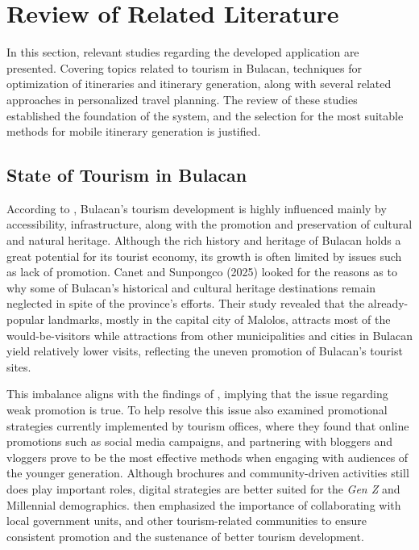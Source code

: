 \section{Review of Related Literature}
In this section, relevant studies regarding the developed application are presented. Covering topics related to tourism in Bulacan, techniques for optimization of itineraries and itinerary generation, along with several related approaches in personalized travel planning. The review of these studies established the foundation of the system, and the selection for the most suitable methods for mobile itinerary generation is justified.

\subsection{State of Tourism in Bulacan}

According to \textcite{Canet2024P}, Bulacan’s tourism development is highly influenced mainly by accessibility, infrastructure, along with the promotion and preservation of cultural and natural heritage. Although the rich history and heritage of Bulacan holds a great potential for its tourist economy, its growth is often limited by issues such as lack of promotion. Canet and Sunpongco (2025) looked for the reasons as to why some of Bulacan’s historical and cultural heritage destinations remain neglected in spite of the province's efforts. Their study revealed that the already-popular landmarks, mostly in the capital city of Malolos, attracts most of the would-be-visitors while attractions from other municipalities and cities in Bulacan yield relatively lower visits, reflecting the uneven promotion of Bulacan’s tourist sites.

This imbalance aligns with the findings of \textcite{Canet2024P}, implying that the issue regarding weak promotion is true. To help resolve this issue \textcite{Canet2025S} also examined promotional strategies currently implemented by tourism offices, where they found that online promotions such as social media campaigns, and partnering with bloggers and vloggers prove to be the most effective methods when engaging with audiences of the younger generation. Although brochures and community-driven activities still does play important roles, digital strategies are better suited for the \textit{Gen Z} and Millennial demographics. \textcite{Canet2025S} then emphasized the importance of collaborating with local government units, and other tourism-related communities to ensure consistent promotion and the sustenance of better tourism development.

